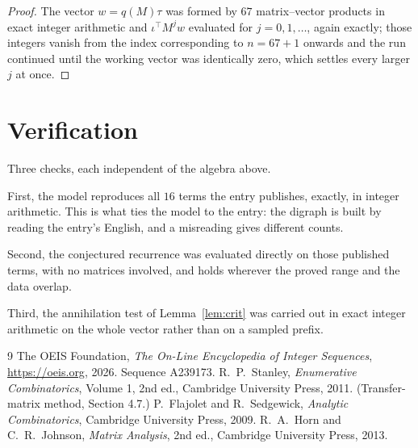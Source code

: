 \documentclass[11pt,a4paper]{article}
\theoremstyle{plain}
\theoremstyle{definition}
\begin{document}
\begin{proof}
The vector $w=q(M)\tau$ was formed by $67$ matrix--vector products in exact integer
arithmetic and $\iota^{\!\top}M^{j}w$ evaluated for $j=0,1,\dots$, again exactly; those
integers vanish from the index corresponding to $n=67+1$ onwards and the run continued
until the working vector was identically zero, which settles every larger $j$ at once.
\end{proof}

\section{Verification}

Three checks, each independent of the algebra above.

First, the model reproduces all $16$ terms the entry publishes, exactly, in integer
arithmetic. This is what ties the model to the entry: the digraph is built by reading the
entry's English, and a misreading gives different counts.

Second, the conjectured recurrence was evaluated directly on those published terms, with no
matrices involved, and holds wherever the proved range and the data overlap.

Third, the annihilation test of Lemma~\ref{lem:crit} was carried out in exact integer
arithmetic on the whole vector rather than on a sampled prefix.

\begin{thebibliography}{9}
 The OEIS Foundation, \emph{The On-Line Encyclopedia of Integer
Sequences}, \url{https://oeis.org}, 2026. Sequence A239173.
 R.~P.~Stanley, \emph{Enumerative Combinatorics}, Volume 1, 2nd ed.,
Cambridge University Press, 2011. (Transfer-matrix method, Section 4.7.)
 P.~Flajolet and R.~Sedgewick, \emph{Analytic Combinatorics}, Cambridge
University Press, 2009.
 R.~A.~Horn and C.~R.~Johnson, \emph{Matrix Analysis}, 2nd ed., Cambridge
University Press, 2013.
\end{thebibliography}
\end{document}

